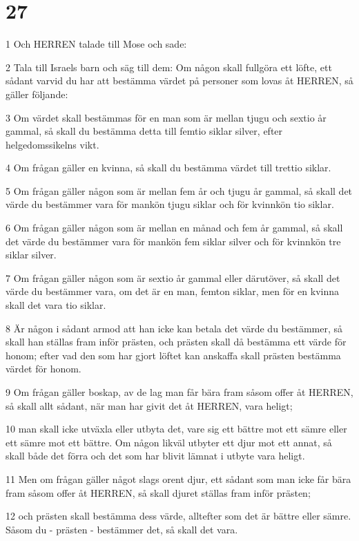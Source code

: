 \chapter{27}

\par 1 Och HERREN talade till Mose och sade:
\par 2 Tala till Israels barn och säg till dem: Om någon skall fullgöra ett löfte, ett sådant varvid du har att bestämma värdet på personer som lovas åt HERREN, så gäller följande:
\par 3 Om värdet skall bestämmas för en man som är mellan tjugu och sextio år gammal, så skall du bestämma detta till femtio siklar silver, efter helgedomssikelns vikt.
\par 4 Om frågan gäller en kvinna, så skall du bestämma värdet till trettio siklar.
\par 5 Om frågan gäller någon som är mellan fem år och tjugu år gammal, så skall det värde du bestämmer vara för mankön tjugu siklar och för kvinnkön tio siklar.
\par 6 Om frågan gäller någon som är mellan en månad och fem år gammal, så skall det värde du bestämmer vara för mankön fem siklar silver och för kvinnkön tre siklar silver.
\par 7 Om frågan gäller någon som är sextio år gammal eller därutöver, så skall det värde du bestämmer vara, om det är en man, femton siklar, men för en kvinna skall det vara tio siklar.
\par 8 Är någon i sådant armod att han icke kan betala det värde du bestämmer, så skall han ställas fram inför prästen, och prästen skall då bestämma ett värde för honom; efter vad den som har gjort löftet kan anskaffa skall prästen bestämma värdet för honom.
\par 9 Om frågan gäller boskap, av de lag man får bära fram såsom offer åt HERREN, så skall allt sådant, när man har givit det åt HERREN, vara heligt;
\par 10 man skall icke utväxla eller utbyta det, vare sig ett bättre mot ett sämre eller ett sämre mot ett bättre. Om någon likväl utbyter ett djur mot ett annat, så skall både det förra och det som har blivit lämnat i utbyte vara heligt.
\par 11 Men om frågan gäller något slags orent djur, ett sådant som man icke får bära fram såsom offer åt HERREN, så skall djuret ställas fram inför prästen;
\par 12 och prästen skall bestämma dess värde, alltefter som det är bättre eller sämre. Såsom du - prästen - bestämmer det, så skall det vara.

